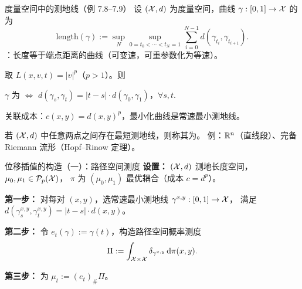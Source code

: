 \begin{frame}{度量空间中的测地线（例 7.8–7.9）}
  设 $(\mathcal{X},d)$ 为度量空间，曲线 $\gamma:[0,1]\to\mathcal{X}$ 的为
  \[
    \mathrm{length}(\gamma):=\sup_{N}\sup_{0=t_{0}<\cdots<t_{N}=1}
    \sum_{i=0}^{N-1}d(\gamma_{t_{i}},\gamma_{t_{i+1}}).
  \]
  ：长度等于端点距离的曲线（可变速，可重参数化为等速）。

   取 $L(x,v,t)=|v|^{p}$（$p>1$）。则

  $\gamma$ 为 $\iff$ $d(\gamma_{s},\gamma_{t})=|t-s|\cdot d(\gamma_{0},\gamma_{1})$，$\forall s,t$.

  关联成本：$c(x,y)=d(x,y)^{p}$，最小化曲线是常速最小测地线。

  若 $(\mathcal{X},d)$ 中任意两点之间存在最短测地线，则称其为。
  例：$\mathbb{R}^{n}$（直线段）、完备 Riemann 流形（Hopf–Rinow 定理）。

\end{frame}

\begin{frame}{位移插值的构造（一）：路径空间测度}
  \textbf{设置：} $(\mathcal{X},d)$ 测地长度空间，$\mu_{0},\mu_{1}\in\mathcal{P}_{p}(\mathcal{X})$，
  $\pi$ 为 $(\mu_{0},\mu_{1})$ 最优耦合（成本 $c=d^{p}$）。

  \textbf{第一步：} 对每对 $(x,y)$，选常速最小测地线 $\gamma^{x,y}:[0,1]\to\mathcal{X}$，
  满足 $d(\gamma^{x,y}_{s},\gamma^{x,y}_{t})=|t-s|\cdot d(x,y)$。

  \textbf{第二步：} 令 $e_{t}(\gamma):=\gamma(t)$，构造路径空间概率测度
  \[
    \Pi:=\int_{\mathcal{X}\times\mathcal{X}}\delta_{\gamma^{x,y}}\,\mathrm{d}\pi(x,y).
  \]

  \textbf{第三步：} 为 $\mu_{t}:=(e_{t})_{\#}\Pi$。

\end{frame}

